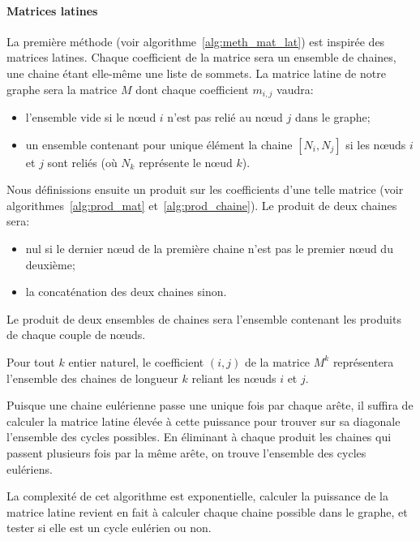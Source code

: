     \paragraph{Matrices latines}
      La première méthode (voir algorithme~\ref{alg:meth_mat_lat}) est inspirée
      des matrices latines. Chaque coefficient de la matrice sera un ensemble
      de chaines, une chaine étant elle-même une liste de sommets. La matrice
      latine de notre graphe sera la matrice $M$ dont chaque coefficient
      $m_{i,j}$ vaudra:
      \begin{itemize}
        \item l'ensemble vide si le nœud $i$ n'est pas relié au nœud $j$ dans
          le graphe;
        \item un ensemble contenant pour unique élément la chaine  $[N_i,N_j]$
          si les nœuds $i$ et $j$ sont reliés (où $N_k$ représente le nœud
          $k$).
      \end{itemize}

      Nous définissions ensuite un produit sur les coefficients d'une telle
      matrice (voir algorithmes~\ref{alg:prod_mat} et~\ref{alg:prod_chaine}). Le
      produit de deux chaines sera:
      \begin{itemize}
        \item nul si le dernier nœud de la première chaine n'est pas le premier
          nœud du deuxième;
        \item la concaténation des deux chaines sinon.
      \end{itemize}

      Le produit de deux ensembles de chaines sera l'ensemble contenant les
      produits de chaque couple de nœuds.

      Pour tout $k$ entier naturel, le coefficient $(i,j)$ de la matrice $M^k$
      représentera l'ensemble des chaines de longueur $k$ reliant les nœuds $i$
      et $j$.

      Puisque une chaine eulérienne passe une unique fois par chaque arête, il
      suffira de calculer la matrice latine élevée à cette puissance pour
      trouver sur sa diagonale l'ensemble des cycles possibles. En éliminant à
      chaque produit les chaines qui passent plusieurs fois par la même arête,
      on trouve l'ensemble des cycles eulériens.

      La complexité de cet algorithme est exponentielle, calculer la puissance
      de la matrice latine revient en fait à calculer chaque chaine possible dans
      le graphe, et tester si elle est un cycle eulérien ou non.

